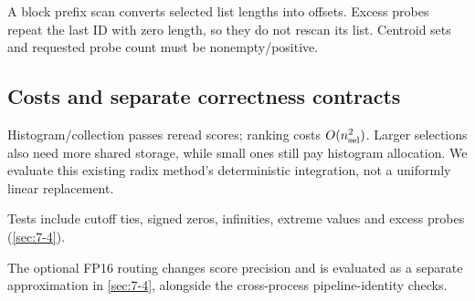 A block prefix scan converts selected list lengths into offsets. Excess probes repeat the last ID with zero length, so they do not rescan its list. Centroid sets and requested probe count must be nonempty/positive.

\subsection{Costs and separate correctness contracts}

Histogram/collection passes reread scores; ranking costs $O(n_{\rm sel}^2)$. Larger selections also need more shared storage, while small ones still pay histogram allocation. We evaluate this existing radix method's deterministic integration, not a uniformly linear replacement.

Tests include cutoff ties, signed zeros, infinities, extreme values and excess probes (\cref{sec:7-4}).


The optional FP16 routing changes score precision and is evaluated as
a separate approximation in \cref{sec:7-4}, alongside the cross-process
pipeline-identity checks.
